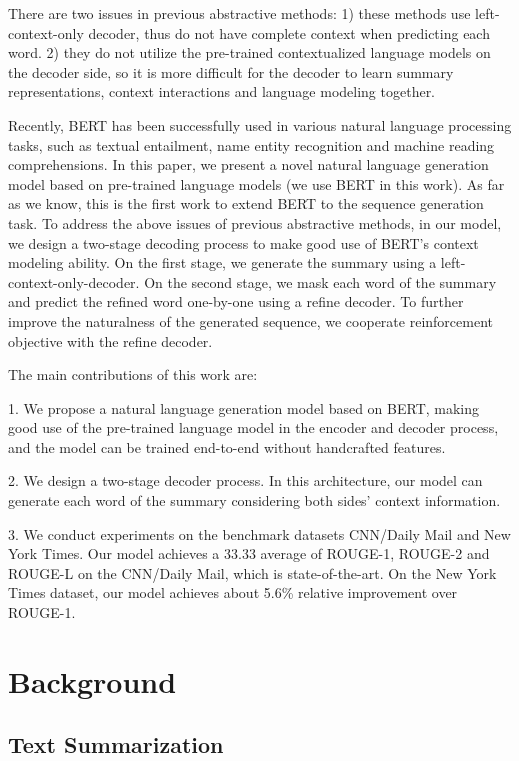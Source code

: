 \documentclass{article}
\begin{document}
There are two issues in previous abstractive methods: 
1) these methods use left-context-only decoder, thus do not have complete context when predicting each word.
2) they do not utilize the pre-trained contextualized language models on the decoder side, so it is more difficult for the decoder to learn summary representations, context interactions and language modeling together.


Recently, BERT has been successfully used in various natural language processing tasks, such as textual entailment, name entity recognition and machine reading comprehensions. In this paper, we present a novel natural language generation model based on pre-trained language models (we use BERT in this work). As far as we know, this is the first work to extend BERT to the sequence generation task. 
To address the above issues of previous abstractive methods, in our model, we design a two-stage decoding process to make good use of BERT's context modeling ability.
On the first stage, we generate the summary using a left-context-only-decoder. 
On the second stage, we mask each word of the summary and predict the refined word one-by-one using a refine decoder. To further improve the naturalness of the generated sequence, we cooperate reinforcement objective with the refine decoder.

The main contributions of this work are:

1. We propose a natural language generation model based on BERT, making good use of the pre-trained language model in the encoder and decoder process, and the model can be trained end-to-end without handcrafted features.

2. We design a two-stage decoder process. In this architecture, our model can generate each word of the summary considering both sides' context information.

3. We conduct experiments on the benchmark datasets CNN/Daily Mail and New York Times. Our model achieves a 33.33 average of ROUGE-1, ROUGE-2 and ROUGE-L on the CNN/Daily Mail, which is state-of-the-art. On the New York Times dataset, our model achieves about 5.6\% relative improvement over ROUGE-1.

\section{Background}

\subsection{Text Summarization}
\end{document}
